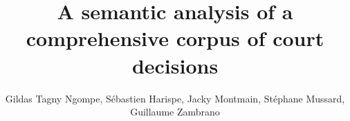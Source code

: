 \documentclass[runningheads,a4paper]{llncs}
\begin{document}
\pagestyle{empty}
\nocite{}
\mainmatter  %

\title{A semantic analysis of a comprehensive corpus of court decisions}

\titlerunning{}

%
%
\author{Gildas Tagny Ngompe, Sébastien Harispe, Jacky Montmain, Stéphane Mussard, Guillaume Zambrano}%
%
\authorrunning{
}


%
%

\maketitle
\end{document}
